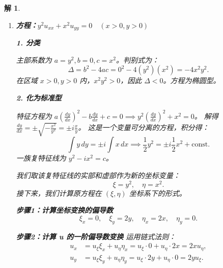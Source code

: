 \documentclass[12pt,a4paper]{article}
\newtheorem*{solution}{解}
\begin{document}
\begin{solution}
\begin{enumerate}[(1)]
			\textbf{情形 (iii)：当 \(y = 0\) 时 (抛物型)}
			
			此时原方程退化为 \(u_{xx} + \frac{1}{2}u_y = 0\)。
			令 \(\xi = x, \eta = -2y\)，则 \(u_y = -2u_\eta\), \(u_{xx} = u_{\xi\xi}\)。
			代入得 \(u_{\xi\xi} - u_\eta = 0\)，即标准型 \(u_\eta = u_{\xi\xi}\)。
			
			\newpage
		\item \textbf{方程：\( y^2 u_{xx} + x^2 u_{yy} = 0 \quad (x>0, y>0) \)}
		
		\textbf{1. 分类}
		
		主部系数为 \(a=y^2, b=0, c=x^2\)。判别式为：
		\[ \Delta = b^2 - 4ac = 0^2 - 4(y^2)(x^2) = -4x^2y^2. \]
		在区域 \(x>0, y>0\) 内，\(x^2y^2 > 0\)，因此 \(\Delta < 0\)。方程为椭圆型。
		
		\textbf{2. 化为标准型}
		
		特征方程为 \(a(\frac{dy}{dx})^2 - b\frac{dy}{dx} + c = 0 \implies y^2(\frac{dy}{dx})^2 + x^2 = 0\)。
		解得 \(\frac{dy}{dx} = \pm \sqrt{-\frac{x^2}{y^2}} = \pm i \frac{x}{y}\)。
		这是一个变量可分离的方程，积分得：
		\[ \int y \,dy = \pm i \int x \,dx \implies \frac{1}{2}y^2 = \pm i \frac{1}{2}x^2 + \text{const}. \]
		一族复特征线为 \(y^2 - ix^2 = c\)。
		
		我们取该复特征线的实部和虚部作为新的坐标变量：
		\[ \xi = y^2, \quad \eta = x^2. \]
		接下来，我们计算原方程在 \((\xi, \eta)\) 坐标系下的形式。
		
		\textbf{步骤1：计算坐标变换的偏导数}
		\[
		\xi_x = 0, \quad \xi_y = 2y, \quad \eta_x = 2x, \quad \eta_y = 0.
		\]
		
		\textbf{步骤2：计算 u 的一阶偏导数变换}
		运用链式法则：
		\begin{align*}
			u_x &= u_\xi \xi_x + u_\eta \eta_x = u_\xi \cdot 0 + u_\eta \cdot 2x = 2x u_\eta, \\
			u_y &= u_\xi \xi_y + u_\eta \eta_y = u_\xi \cdot 2y + u_\eta \cdot 0 = 2y u_\xi.
		\end{align*}
		

\end{enumerate}
\end{solution}
\end{document}
